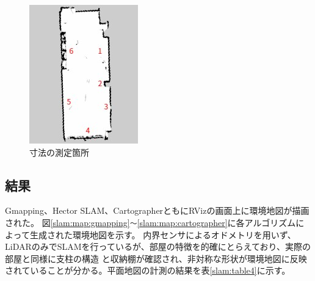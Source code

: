 \begin{figure}[h]
  \begin{center}
  \includegraphics[width=.8\linewidth]{img/slam_32.jpg}
  \caption{寸法の測定箇所}
  \label{slam:map:place}
  \end{center}
\end{figure}

\clearpage

\subsection{結果}
Gmapping、Hector SLAM、CartographerともにRVizの画面上に環境地図が描画された。
図\ref{slam:map:gmapping}\verb|～|\ref{slam:map:cartographer}に各アルゴリズムによって生成された環境地図を示す。
内界センサによるオドメトリを用いず、LiDARのみでSLAMを行っているが、部屋の特徴を的確にとらえており、実際の部屋と同様に支柱の構造
と収納棚が確認され、非対称な形状が環境地図に反映されていることが分かる。平面地図の計測の結果を表\ref{slam:table4}に示す。

